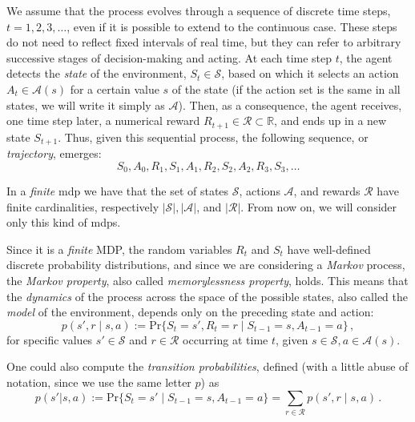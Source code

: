 We assume that the process evolves through a sequence of discrete time steps, $t = 1, 2, 3, \ldots$, even if it is possible to extend to the continuous case. These steps do not need to reflect fixed intervals of real time, but they can refer to arbitrary successive stages of decision-making and acting. At each time step $t$, the agent detects the \emph{state} of the environment, $S_t \in \mathcal S$, based on which it selects an action $A_t \in \mathcal A(s)$ for a certain value $s$ of the state (if the action set is the same in all states, we will write it simply as $\mathcal A$). Then, as a consequence, the agent receives, one time step later, a numerical reward $R_{t+1} \in \mathcal R \subset \mathbb R$, and ends up in a new state $S_{t+1}$. Thus, given this sequential process, the following sequence, or \emph{trajectory}, emerges:
\begin{equation}
    S_0, A_0, R_1, S_1, A_1, R_2, S_2, A_2, R_3, S_3, \ldots
\end{equation}

In a \emph{finite} \acrshort{mdp} we have that the set of states $\mathcal S$, actions $\mathcal A$, and rewards $\mathcal R$ have finite cardinalities, respectively $|\mathcal S|, |\mathcal A|$, and $|\mathcal R|$. From now on, we will consider only this kind of \acrshort{mdp}s.

Since it is a \textit{finite} MDP, the random variables $R_t$ and $S_t$ have well-defined discrete probability distributions, and since we are considering a \textit{Markov} process, the \emph{Markov property}, also called \emph{memorylessness property}, holds. This means that the \emph{dynamics} of the process across the space of the possible states, also called the \emph{model} of the environment, depends only on the preceding state and action:
\begin{equation}
    p(s', r \mid s, a) := \text{Pr}\{S_t = s', R_t = r \mid S_{t-1} = s, A_{t-1} = a\} \, ,
    \label{eq:transitions}
\end{equation}
for specific values $s' \in \mathcal S$ and $r \in \mathcal R$ occurring at time $t$, given $s \in \mathcal S, a \in \mathcal A(s)$.

One could also compute the \emph{transition probabilities}, defined (with a little abuse of notation, since we use the same letter $p$) as
\begin{equation}
    p(s'|s, a) := \text{Pr}\{S_t = s' \mid S_{t-1} = s, A_{t-1} = a\} = \sum_{r \in \mathcal R} p(s', r \mid s, a) \, .
\end{equation}

